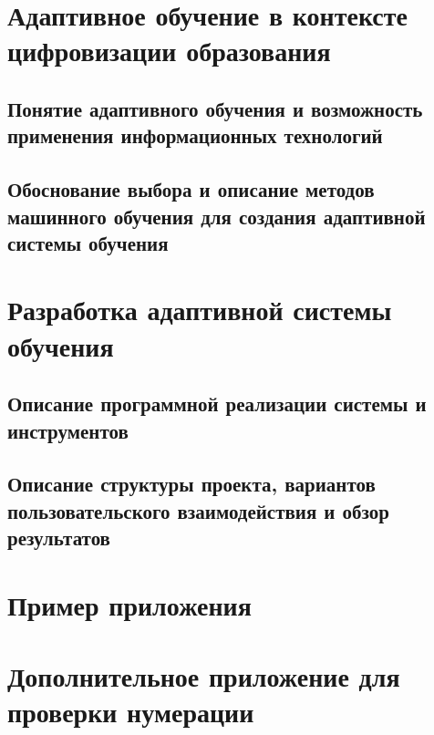 \makesthgtitle

\tableofcontents
\clearpage



\chapter{Адаптивное обучение в контексте цифровизации образования}
\section{Понятие адаптивного обучения и возможность применения информационных технологий}


\section{Обоснование выбора и описание методов машинного обучения для создания адаптивной системы обучения}


\chapter{Разработка адаптивной системы обучения}
\section{Описание программной реализации системы и инструментов}


\section{Описание структуры проекта, вариантов пользовательского взаимодействия и обзор результатов}




\nocite{gost732,gost705,herzen-vkr-requirements,herzen-gia,minobrnauki636}
\printbibliography[heading=bibintoc,title={Список используемых источников}]

\appendix
\chapter{Пример приложения}


\chapter{Дополнительное приложение для проверки нумерации}

